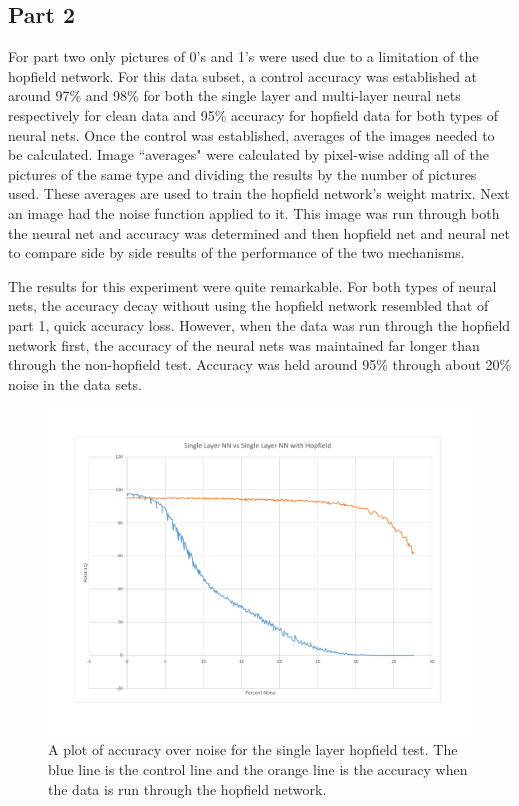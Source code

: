 \documentclass{IEEEtran}
\begin{document}
		\subsection{Part 2}
			For part two only pictures of 0's and 1's were used due to a limitation of the hopfield network. For this data subset, a control accuracy was established at around 97\% and 98\% for both the single layer and multi-layer neural nets respectively for clean data and 95\% accuracy for hopfield data for both types of neural nets. Once the control was established, averages of the images needed to be calculated. Image ``averages" were calculated by pixel-wise adding all of the pictures of the same type and dividing the results by the number of pictures used. These averages are used to train the hopfield network's weight matrix. Next an image had the noise function applied to it. This image was run through both the neural net and accuracy was determined and then hopfield net and neural net to compare side by side results of the performance of the two mechanisms.
			
			The results for this experiment were quite remarkable. For both types of neural nets, the accuracy decay without using the hopfield network resembled that of part 1, quick accuracy loss. However, when the data was run through the hopfield network first, the accuracy of the neural nets was maintained far longer than through the non-hopfield test. Accuracy was held around 95\% through about 20\% noise in the data sets.
			
			\begin{figure}
				\centering
				\includegraphics[width=\linewidth]{SingleLayerHop.pdf}
				\caption{A plot of accuracy over noise for the single layer hopfield test. The blue line is the control line and the orange line is the accuracy when the data is run through the hopfield network.}
				\label{part2A}
			\end{figure}
			
\end{document}
